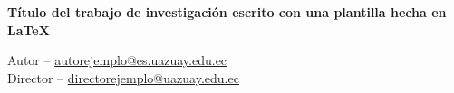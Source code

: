 \pagestyle{fancy}

\noindent\hrulefill
    \begin{center}
        \Large \textbf{Título del trabajo de investigación escrito con una plantilla hecha en \LaTeX\\}
        \vspace{0.5cm}
      
        \small Autor --
        \href{mailto:autorejemplo@es.uazuay.edu.ec}{autorejemplo@es.uazuay.edu.ec} \\
        Director --
        \href{mailto:directorejemplo@uazuay.edu.ec}{directorejemplo@uazuay.edu.ec}
    \end{center}
\hrulefill
